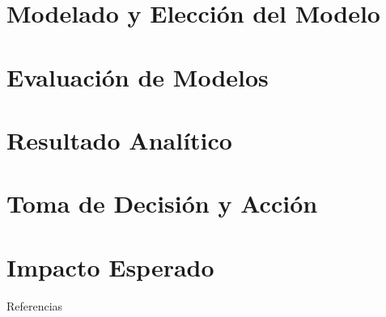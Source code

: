 \documentclass[11pt, aspectratio=169]{beamer}
\begin{document}
\section{Modelado y Elección del Modelo}


\section{Evaluación de Modelos}


\section{Resultado Analítico}


\section{Toma de Decisión y Acción}


\section{Impacto Esperado}


\begin{frame}[allowframebreaks]{Referencias}
    
    
\end{frame}
\end{document}
